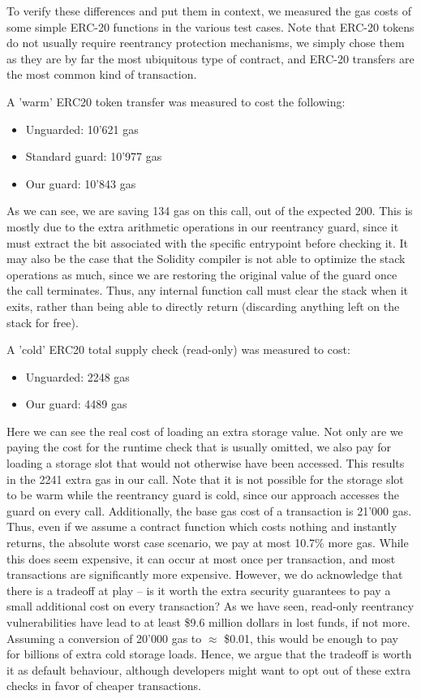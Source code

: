 To verify these differences and put them in context, we measured the gas costs of some simple ERC-20 functions in the various test cases. Note that ERC-20 tokens do not usually require reentrancy protection mechanisms, we simply chose them as they are by far the most ubiquitous type of contract, and ERC-20 transfers are the most common kind of transaction.
\par
A 'warm' ERC20 token transfer was measured to cost the following:
\begin{itemize}
  \item Unguarded: 10'621 gas
  \item Standard guard: 10'977 gas
  \item Our guard: 10'843 gas
\end{itemize}
As we can see, we are saving 134 gas on this call, out of the expected 200. This is mostly due to the extra arithmetic operations in our reentrancy guard, since it must extract the bit associated with the specific entrypoint before checking it. It may also be the case that the Solidity compiler is not able to optimize the stack operations as much, since we are restoring the original value of the guard once the call terminates. Thus, any internal function call must clear the stack when it exits, rather than being able to directly return (discarding anything left on the stack for free).
\par
A 'cold' ERC20 total supply check (read-only) was measured to cost:
\begin{itemize}
  \item Unguarded: 2248 gas
  \item Our guard: 4489 gas
\end{itemize}
Here we can see the real cost of loading an extra storage value. Not only are we paying the cost for the runtime check that is usually omitted, we also pay for loading a storage slot that would not otherwise have been accessed. This results in the 2241 extra gas in our call. Note that it is not possible for the  storage slot to be warm while the reentrancy guard is cold, since our approach accesses the guard on every call. Additionally, the base gas cost of a transaction is 21'000 gas. Thus, even if we assume a contract function which costs nothing and instantly returns, the absolute worst case scenario, we pay at most 10.7\% more gas. While this does seem expensive, it can occur at most once per transaction, and most transactions are significantly more expensive. However, we do acknowledge that there is a tradeoff at play -- is it worth the extra security guarantees to pay a small additional cost on every transaction? As we have seen, read-only reentrancy vulnerabilities have lead to at least \$9.6 million dollars in lost funds, if not more. Assuming a conversion of 20'000 gas to $\approx$ \$0.01, this would be enough to pay for billions of extra cold storage loads. Hence, we argue that the tradeoff is worth it as default behaviour, although developers might want to opt out of these extra checks in favor of cheaper transactions.





